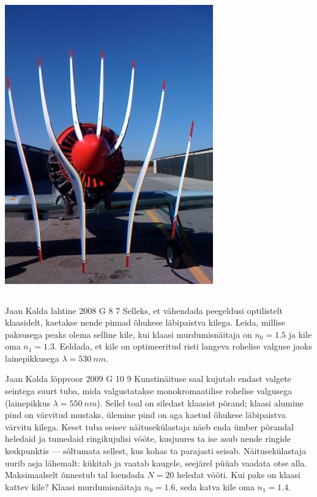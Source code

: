 \documentclass[11pt]{article}
\begin{document}
{{\begin{center}
	\includegraphics[width=90mm]{2010-v3g-10-Propeller.jpg}
\end{center}
\fi
}
\newpage\subsection{\protect{}}

{Jaan Kalda} %
{lahtine} %
{2008} %
{G 8} %
{7} %
{
\ifStatement
Selleks, et vähendada peegeldusi optilistelt klaasidelt, kaetakse nende pinnad õhukese läbipaistva kilega. Leida, millise paksusega peaks olema selline kile, kui klaasi murdumisnäitaja on $n_0 = \num{1,5}$ ja kile oma $n_1 = \num{1,3}$. Eeldada, et kile on optimeeritud risti langeva rohelise valguse jaoks lainepikkusega $\lambda = \SI{530}{nm}$.
\fi
}

{Jaan Kalda} %
{lõppvoor} %
{2009} %
{G 10} %
{9} %
{
\ifStatement
Kunstinäituse saal kujutab endast valgete seintega suurt tuba, mida valgustatakse monokromaatilise rohelise valgusega (lainepikkus $\lambda=\SI{550}{nm}$).
Sellel toal on siledast klaasist põrand; klaasi
alumine pind on värvitud mustaks, ülemine pind on aga kaetud õhukese läbipaistva värvitu kilega.
Keset tuba seisev näitusekülastaja
näeb enda ümber põrandal heledaid ja tumedaid ringikujulisi vööte, kusjuures ta ise asub nende ringide keskpunktis --- sõltumata sellest, kus kohas ta parajasti seisab. Näitusekülastaja uurib asja lähemalt: kükitab ja vaatab kaugele, seejärel püüab vaadata otse alla. Maksimaalselt õnnestub tal loendada $N=\num{20}$ heledat vööti. Kui paks on klaasi kattev kile?
Klaasi murdumisnäitaja $n_0=\num{1.6}$, seda katva kile oma $n_1=\num{1.4}$.
\fi
}
\newpage\subsection{\protect{}}

}
\end{document}
